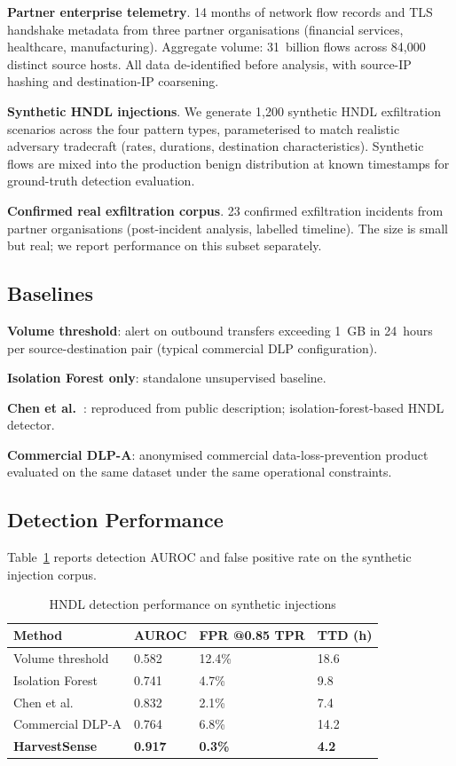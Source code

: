\documentclass[sigconf,nonacm]{acmart}
\begin{document}
\textbf{Partner enterprise telemetry}. 14 months of network flow
records and TLS handshake metadata from three partner organisations
(financial services, healthcare, manufacturing). Aggregate volume:
31~billion flows across 84{,}000 distinct source hosts. All data
de-identified before analysis, with source-IP hashing and
destination-IP coarsening.

\textbf{Synthetic HNDL injections}. We generate 1{,}200 synthetic
HNDL exfiltration scenarios across the four pattern types,
parameterised to match realistic adversary tradecraft (rates,
durations, destination characteristics). Synthetic flows are mixed
into the production benign distribution at known timestamps for
ground-truth detection evaluation.

\textbf{Confirmed real exfiltration corpus}. 23 confirmed exfiltration
incidents from partner organisations (post-incident analysis,
labelled timeline). The size is small but real; we report
performance on this subset separately.

\subsection{Baselines}

\textbf{Volume threshold}: alert on outbound transfers exceeding
1~GB in 24~hours per source-destination pair (typical commercial DLP
configuration).

\textbf{Isolation Forest only}: standalone unsupervised baseline.

\textbf{Chen et al.~\cite{chen2025hndlflow}}: reproduced from public
description; isolation-forest-based HNDL detector.

\textbf{Commercial DLP-A}: anonymised commercial data-loss-prevention
product evaluated on the same dataset under the same operational
constraints.

\subsection{Detection Performance}

Table~\ref{tab:detection} reports detection AUROC and false positive
rate on the synthetic injection corpus.

\begin{table}[h]
\caption{HNDL detection performance on synthetic injections}
\label{tab:detection}
\small
\begin{tabularx}{\columnwidth}{@{}p{2.6cm}X X X@{}}
\toprule
\textbf{Method} & \textbf{AUROC} & \textbf{FPR @0.85 TPR} & \textbf{TTD (h)} \\
\midrule
Volume threshold     & 0.582 & 12.4\% & 18.6 \\
Isolation Forest     & 0.741 & 4.7\%  & 9.8 \\
Chen et al.\         & 0.832 & 2.1\%  & 7.4 \\
Commercial DLP-A     & 0.764 & 6.8\%  & 14.2 \\
\textbf{HarvestSense}& \textbf{0.917} & \textbf{0.3\%} & \textbf{4.2} \\
\bottomrule
\end{tabularx}
\end{table}
\end{document}
